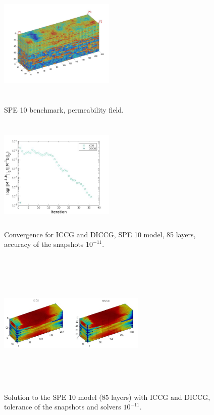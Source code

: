 \documentclass{ecmorXV}
\begin{document}
\begin{figure}[!h]
\centering
\begin{minipage}{.5\textwidth}
 \centering
\includegraphics[width=5.5cm,height=5.5cm,keepaspectratio]
{perm_layer_.jpg}
\caption{SPE 10 benchmark, permeability field.}
\label{fig:permspec}
\end{minipage}%
\hspace{4mm}
\begin{minipage}{.45\textwidth}
 \centering
\includegraphics[width=5.5cm,height=5.5cm,keepaspectratio]
{conv_deftol-7_5_5.jpg}
\caption{Convergence for ICCG and DICCG, SPE 10 model, 85 layers, accuracy of the snapshots $10 ^{-11}$.}
\label{fig:convspec}
\end{minipage}
\end{figure}
\begin{figure}[!h]
\centering
\begin{minipage}{.6\textwidth}
 \centering
\includegraphics[width=7cm,height=7cm,keepaspectratio]
{SPE10_85_sol.jpg}
\caption{Solution to the SPE 10 model (85 layers)
with ICCG and DICCG, tolerance of the snapshots and solvers $10^{-11}$.}
\label{fig:solspec}
\end{minipage}%
\hspace{4mm}
\end{figure}
\end{document}
